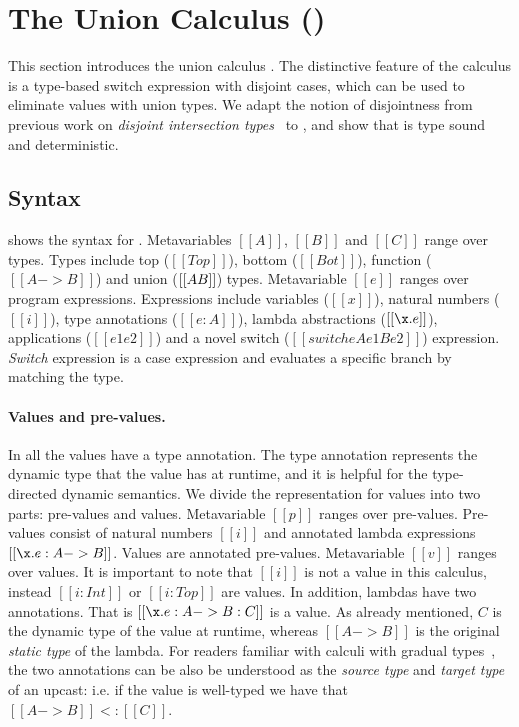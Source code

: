 \section{The Union Calculus (\name)}
\label{sec:union}

This section introduces the union calculus \name. The distinctive feature
of the \name calculus is a type-based switch expression with disjoint
cases, which can be used to eliminate values with union types.
We adapt the notion of disjointness from previous work on
\emph{disjoint intersection types}~\cite{} to \name, and show that \name is type
sound and deterministic.


\subsection{Syntax}\label{sec:union:syntax}
 shows the syntax for \cal. Metavariables
$[[A]]$, $[[B]]$ and $[[C]]$ range over types.  Types include top ($[[Top]]$),
bottom ($[[Bot]]$), function ($[[A -> B]]$) and union ($[[A \/ B]]$)
types. Metavariable $[[e]]$ ranges over program
expressions. Expressions include variables ($[[x]]$), natural numbers
($[[i]]$), type annotations ($[[e:A]]$), lambda abstractions
($[[\x.e]]$), applications ($[[e1 e2]]$) and a novel switch ($[[switch
    e A e1 B e2]]$) expression. \emph{Switch} expression is a case
expression and evaluates a specific branch by matching the
type.

\paragraph{Values and pre-values.} In \name all the values have
a type annotation. The type annotation represents the dynamic type
that the value has at runtime, and
it is helpful for the type-directed dynamic semantics.
We divide the representation for values into two parts: pre-values and
values.
Metavariable $[[p]]$ ranges over pre-values. Pre-values
consist of natural numbers $[[i]]$
and annotated lambda expressions $[[\x.e : A -> B]]$. Values are
annotated pre-values. Metavariable $[[v]]$ ranges over
values. It is important to note that $[[i]]$ is not a value in this
calculus, instead $[[i:Int]]$ or $[[i:Top]]$ are values.
In addition, lambdas have two annotations. That is $[[\x.e : A -> B : C]]$ is a value.
As already mentioned, $C$ is the dynamic type of the value
at runtime, whereas $[[A -> B]]$ is the original \emph{static type} of the lambda.
For readers familiar with calculi with gradual types~\cite{}, the two annotations
can be also be understood as the \emph{source type} and \emph{target type}
of an upcast: i.e. if the value is well-typed we have that $[[A -> B]] <: [[C]]$.

